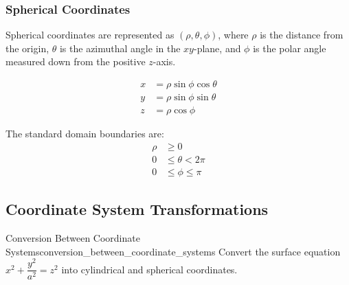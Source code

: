\subsubsection{Spherical Coordinates}
Spherical coordinates are represented as $(\rho, \theta, \phi)$, where $\rho$ is the distance from the origin, $\theta$ is the azimuthal angle in the $xy$-plane, and $\phi$ is the polar angle measured down from the positive $z$-axis.

\begin{align*}
x &= \rho\sin\phi\cos\theta \\
y &= \rho\sin\phi\sin\theta \\
z &= \rho\cos\phi
\end{align*}

The standard domain boundaries are:
\begin{align*}
\rho &\ge 0 \\
0 &\le \theta < 2\pi \\
0 &\le \phi \le \pi
\end{align*}

\begin{center}
\end{center}

\subsection{Coordinate System Transformations}

\begin{problem}{Conversion Between Coordinate Systems}{conversion_between_coordinate_systems}
Convert the surface equation $x^2 + \dfrac{y^2}{a^2} = z^2$ into cylindrical and spherical coordinates.
\end{problem}

